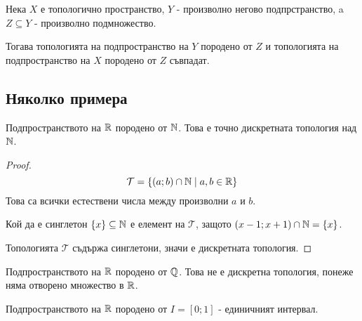 \begin{proposition}
    Нека $X$ е топологично пространство, $Y$ - произволно негово подпрстранство, a $Z \subseteq Y$ - произволно подмножество.

    Тогава топологията на подпространство на $Y$ породено от $Z$ и топологията на подпространство на $X$ породено от $Z$ съвпадат.
\end{proposition}

\subsection{Няколко примера}
\begin{example}
    Подпространството на ${\mathbb{R}}$ породено от ${\mathbb{N}}$. Това е точно дискретната топология над ${\mathbb{N}}$.
\end{example}
\begin{proof}
    \begin{equation}
        \mathcal T = \left\{(a; b) \cap {\mathbb{N}} \mid a, b \in {\mathbb{R}}\right\}
    \end{equation}
    Това са всички естествени числа между произволни $a$ и $b$.

    Кой да е синглетон $\{x\} \subseteq {\mathbb{N}}$ е елемент на $\mathcal T$, защото $(x-1;x+1) \cap {\mathbb{N}} = \{x\}$.

    Топологията $\mathcal T$ съдържа синглетони, значи е дискретната топология.
\end{proof}
\begin{example}
    Подпространството на ${\mathbb{R}}$ породено от ${\mathbb{Q}}$. Това не е дискретна топология, понеже няма отворено множество в ${\mathbb{R}}$. 
\end{example}
\begin{example}
    Подпространството на ${\mathbb{R}}$ породено от $I = [0; 1]$ - единичният интервал.
\end{example}
